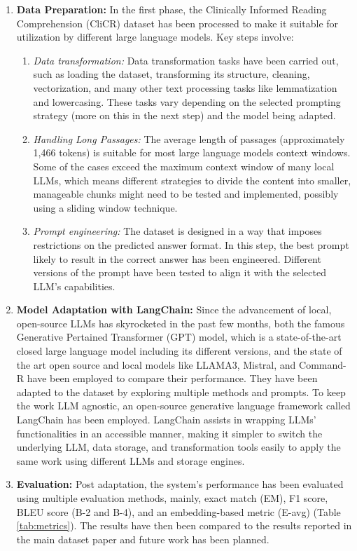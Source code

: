 \documentclass[onecolumn, conference]{IEEEtran}
\begin{document}
\begin{enumerate}
  \item \textbf{Data Preparation:} In the first phase, the Clinically Informed Reading Comprehension (CliCR) dataset has been processed to make it suitable for utilization by different large language models. Key steps involve:
        \begin{enumerate}
          \item \textit{Data transformation:} Data transformation tasks have been carried out, such as loading the dataset, transforming its structure, cleaning, vectorization, and many other text processing tasks like lemmatization and lowercasing. These tasks vary depending on the selected prompting strategy (more on this in the next step) and the model being adapted.

          \item \textit{Handling Long Passages:} The average length of passages (approximately 1,466 tokens) is suitable for most large language models context windows. Some of the cases exceed the maximum context window of many local LLMs, which means different strategies to divide the content into smaller, manageable chunks might need to be tested and implemented, possibly using a sliding window technique.

          \item \textit{Prompt engineering:} The dataset is designed in a way that imposes restrictions on the predicted answer format. In this step, the best prompt likely to result in the correct answer has been engineered. Different versions of the prompt have been tested to align it with the selected LLM's capabilities.
        \end{enumerate}

  \item \textbf{Model Adaptation with LangChain:} Since the advancement of local, open-source LLMs has skyrocketed in the past few months, both the famous Generative Pertained Transformer (GPT) model, which is a state-of-the-art closed large language model including its different versions, and the state of the art open source and local models like LLAMA3, Mistral, and Command-R have been employed to compare their performance. They have been adapted to the dataset by exploring multiple methods and prompts. To keep the work LLM agnostic, an open-source generative language framework called LangChain has been employed. LangChain assists in wrapping LLMs’ functionalities in an accessible manner, making it simpler to switch the underlying LLM, data storage, and transformation tools easily to apply the same work using different LLMs and storage engines.

  \item \textbf{Evaluation:} Post adaptation, the system’s performance has been evaluated using multiple evaluation methods, mainly, exact match (EM), F1 score, BLEU score (B-2 and B-4), and an embedding-based metric (E-avg) (Table \ref{tab:metrics}). The results have then been compared to the results reported in the main dataset paper and future work has been planned.
\end{enumerate}
\end{document}
